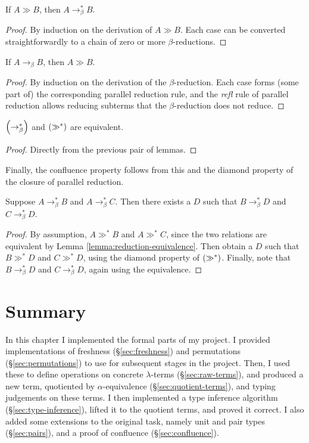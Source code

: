 \begin{lemma}
If \(A \gg B\), then \(A \to_\beta^* B\).
\end{lemma}
\begin{proof}
By induction on the derivation of \(A \gg B\).
Each case can be converted straightforwardly to a chain of zero or more \(\beta\)-reductions.
\end{proof}

\begin{lemma}
If \(A \to_\beta B\), then \(A \gg B\).
\end{lemma}
\begin{proof}
By induction on the derivation of the \(\beta\)-reduction.
Each case forms (some part of) the corresponding parallel reduction rule, and the \emph{refl} rule of parallel reduction allows reducing subterms that the \(\beta\)-reduction does not reduce.
\end{proof}

\begin{lemma}
\label{lemma:reduction-equivalence}
\(\left(\to_\beta^*\right)\) and \(\left(\gg^*\right)\) are equivalent.
\end{lemma}
\begin{proof}
Directly from the previous pair of lemmas.
\end{proof}

Finally, the confluence property follows from this and the diamond property of the closure of parallel reduction.

\begin{theorem}
Suppose \(A \to_\beta^* B\) and \(A \to_\beta^* C\).
Then there exists a \(D\) such that \(B \to_\beta^* D\) and \(C \to_\beta^* D\).
\end{theorem}
\begin{proof}
By assumption, \(A \gg^* B\) and \(A \gg^* C\), since the two relations are equivalent by Lemma \ref{lemma:reduction-equivalence}.
Then obtain a \(D\) such that \(B \gg^* D\) and \(C \gg^* D\), using the diamond property of \(\left(\gg^*\right)\).
Finally, note that \(B \to_\beta^* D\) and \(C \to_\beta^* D\), again using the equivalence.
\end{proof}

\section{Summary}
In this chapter I implemented the formal parts of my project.
I provided implementations of freshness (\S\ref{sec:freshness}) and permutations (\S\ref{sec:permutations}) to use for subsequent stages in the project.
Then, I used these to define operations on concrete \(\lambda\)-terms (\S\ref{sec:raw-terms}), and produced a new term, quotiented by \(\alpha\)-equivalence (\S\ref{sec:quotient-terms}), and typing judgements on these terms.
I then implemented a type inference algorithm (\S\ref{sec:type-inference}), lifted it to the quotient terms, and proved it correct.
I also added some extensions to the original task, namely unit and pair types (\S\ref{sec:pairs}), and a proof of confluence (\S\ref{sec:confluence}).

